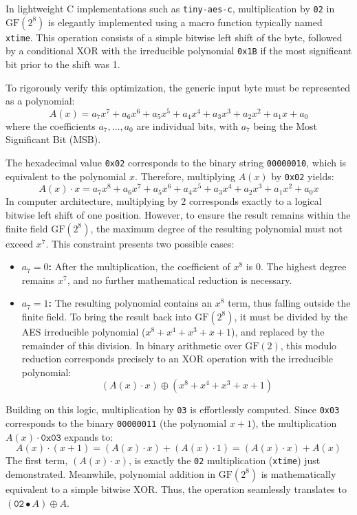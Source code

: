 \documentclass[11pt,a4paper]{report}
\begin{document}
In lightweight C implementations such as \texttt{tiny-aes-c}, multiplication by \texttt{02} in $\mathrm{GF}(2^8)$ is elegantly implemented using a macro function typically named \texttt{xtime}. 
This operation consists of a simple bitwise left shift of the byte, followed by a conditional XOR with the irreducible polynomial \texttt{0x1B} if the most significant bit prior to the shift was 1. 

To rigorously verify this optimization, the generic input byte must be represented as a polynomial:
\[
A(x) = a_7x^7 + a_6x^6 + a_5x^5 + a_4x^4 + a_3x^3 + a_2x^2 + a_1x + a_0
\]
where the coefficients $a_7, \dots, a_0$ are individual bits, with $a_7$ being the Most Significant Bit (MSB).

The hexadecimal value \texttt{0x02} corresponds to the binary string \texttt{00000010}, which is equivalent to the polynomial $x$. 
Therefore, multiplying $A(x)$ by \texttt{0x02} yields:
\[
A(x) \cdot x = a_7x^8 + a_6x^7 + a_5x^6 + a_4x^5 + a_3x^4 + a_2x^3 + a_1x^2 + a_0x
\]
In computer architecture, multiplying by 2 corresponds exactly to a logical bitwise left shift of one position. 
However, to ensure the result remains within the finite field $\mathrm{GF}(2^8)$, the maximum degree of the resulting polynomial must not exceed $x^7$. 
This constraint presents two possible cases:

\begin{itemize}
    \item \textbf{$a_7 = 0$:} After the multiplication, the coefficient of $x^8$ is 0. The highest degree remains $x^7$, and no further mathematical reduction is necessary.
    
    \item \textbf{$a_7 = 1$:} The resulting polynomial contains an $x^8$ term, thus falling outside the finite field. 
    To bring the result back into $\mathrm{GF}(2^8)$, it must be divided by the AES irreducible polynomial ($x^8 + x^4 + x^3 + x + 1$), and replaced by the remainder of this division. 
    In binary arithmetic over $\mathrm{GF}(2)$, this modulo reduction corresponds precisely to an XOR operation with the irreducible polynomial:
    \[
    (A(x) \cdot x) \oplus (x^8 + x^4 + x^3 + x + 1)
    \]
\end{itemize}

Building on this logic, multiplication by \texttt{03} is effortlessly computed. 
Since \texttt{0x03} corresponds to the binary \texttt{00000011} (the polynomial $x + 1$), the multiplication $A(x) \cdot \texttt{0x03}$ expands to:
\[
A(x) \cdot (x + 1) = (A(x) \cdot x) + (A(x) \cdot 1) = (A(x) \cdot x) + A(x) 
\]
The first term, $(A(x) \cdot x)$, is exactly the \texttt{02} multiplication (\texttt{xtime}) just demonstrated. 
Meanwhile, polynomial addition in $\mathrm{GF}(2^8)$ is mathematically equivalent to a simple bitwise XOR. Thus, the operation seamlessly translates to $(\texttt{02} \bullet A) \oplus A$.
\end{document}
